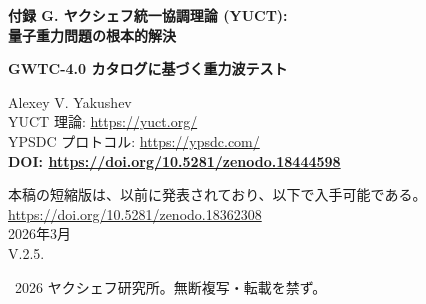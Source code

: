 \documentclass[11pt,a4paper]{article}
\theoremstyle{remark}
\newcommand{\Keff}{K_{\mathrm{eff}}}
\begin{document}
	
	\begin{titlepage}
		\begin{center}
			\vspace*{0cm}
			
			\Huge\textbf{付録 G. ヤクシェフ統一協調理論 (YUCT): \\ 量子重力問題の根本的解決}
			
			\vspace{0.3cm}
			\Large\textbf{GWTC-4.0 カタログに基づく重力波テスト}
			
			\vspace{0.8cm}
			\Large
			Alexey V. Yakushev\\
			
			YUCT 理論: \url{https://yuct.org/}\\
			YPSDC プロトコル: \url{https://ypsdc.com/}\\
			
			\vspace{1.5cm}
			\textbf{DOI: \url{https://doi.org/10.5281/zenodo.18444598}}\\
			
			\vspace{0.5cm}
			
			\large
			本稿の短縮版は、以前に発表されており、以下で入手可能である。\\ \url{https://doi.org/10.5281/zenodo.18362308}\\
			
			\vspace{0.5cm}
			2026年3月 \\ \large V.2.5.
			
			\vspace{3cm}
			\textcopyright~2026 ヤクシェフ研究所。無断複写・転載を禁ず。
			
			\newpage
			
			\begin{abstract}
				\noindent
				本稿は、量子重力問題の決定的な解決策として、ヤクシェフ統一協調理論 (YUCT) の完全な数学的定式化を提示する。時空や重力子を量子化しようとする従来のアプローチとは異なり、YUCT は、量子力学と一般相対性理論の両方が、より根源的な\emph{協調}の原理から創発することを仮定する。我々は以下を展開する：(1) 協調場 $\Psi_{MN}$ を伴う 19 次元幾何学的枠組み、(2) 存在論的基礎としての D+I•R 三つ組、(3) 協調効率 $\Keff$ を通じて全ての物理的相互作用を統一する全ラグランジアン $\mathcal{L}_{\text{YUCT}}$、(4) 極限的ケースとしての量子力学と重力幾何学の導出、(5) 実験室及び天体物理学的スケールで検証可能な量子重力現象に対する具体的な予測。本理論は、量子非局所性と相対論的因果律の間の概念的矛盾を解消し、暗黒エネルギーと暗黒物質に自然な説明を提供し、「量子重力問題」が協調システムの一般理論へと解消される、数学的に一貫した枠組みを提供する。
				

\end{abstract}
\end{center}
\end{titlepage}
\end{document}
